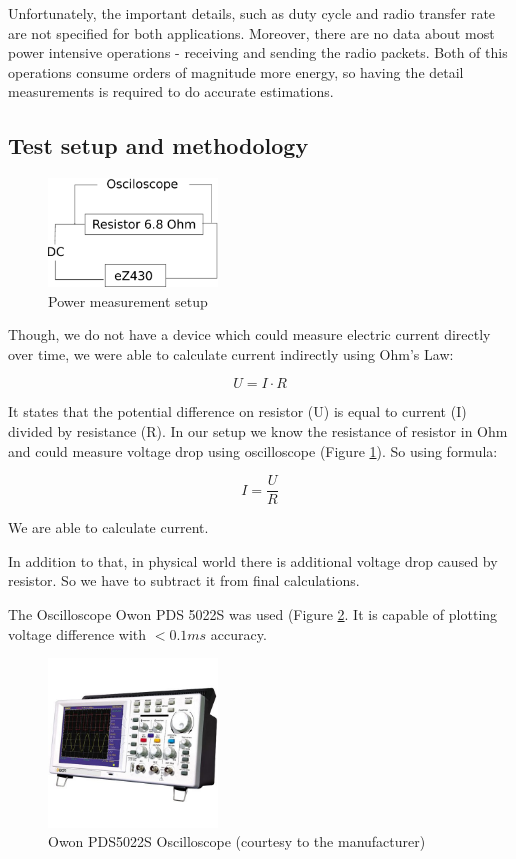 Unfortunately, the important details, such as duty cycle and radio transfer rate are not specified for both applications.
Moreover, there are no data about most power intensive operations - receiving and sending the radio packets.
Both of this operations consume orders of magnitude more energy, so having the detail measurements is required to do accurate estimations.

\subsection{Test setup and methodology}

\begin{figure}[h]
  \centering
  \includegraphics[width=0.4\textwidth]{diagrams/power.eps}
  \caption{Power measurement setup}
  \label{fig:power}
\end{figure}

Though, we do not have a device which could measure electric current directly over time, we were able to calculate current indirectly using Ohm's Law: 

$$
U = I \cdot R
$$

It states that the potential difference on resistor (U) is equal to current (I) divided by resistance (R).
In our setup we know the resistance of resistor in Ohm and could measure voltage drop using oscilloscope (Figure \ref{fig:power}).
So using formula:

$$
I = \frac{U}{R}
$$

We are able to calculate current.


In addition to that, in physical world there is additional voltage drop caused by resistor.
So we have to subtract it from final calculations.

The Oscilloscope Owon PDS 5022S was used (Figure \ref{fig:owon}.
It is capable of plotting voltage difference with $< 0.1 ms$ accuracy.

\begin{figure}[h]
  \centering
  \includegraphics[width=0.4\textwidth]{img/owon_pds5022s.jpg}
  \caption{Owon PDS5022S Oscilloscope (courtesy to the manufacturer)}
  \label{fig:owon}
\end{figure}

